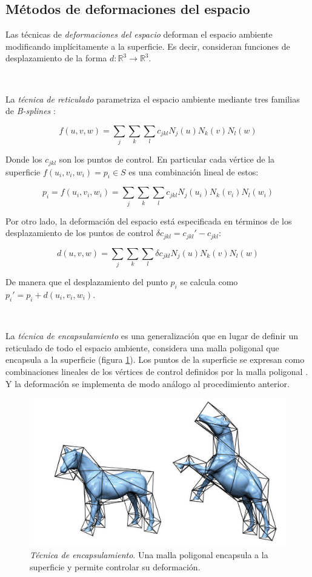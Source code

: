 \documentclass{article}
\begin{document}
\subsection{Métodos de deformaciones del espacio}
Las técnicas de \emph{deformaciones del espacio} deforman el espacio ambiente 
modificando implícitamente a la superficie. Es decir, consideran funciones 
de desplazamiento de la forma $d: \mathbb{R}^3 \rightarrow \mathbb{R}^3$.

\

La \emph{técnica de reticulado} parametriza el espacio ambiente 
mediante tres familias de \emph{B-splines} \cite{G:2015}:

$$f(u,v,w) = \sum_j \sum_k \sum_l c_{jkl} N_j(u) N_k(v) N_l(w)$$

Donde los $c_{jkl}$ son los puntos de control. En particular cada vértice de 
la superficie $f(u_i, v_i, w_i) = p_i \in S$ es una combinación lineal 
de estos:

$$p_i = f(u_i, v_i, w_i) = \sum_j \sum_k \sum_l c_{jkl} N_j(u_i) N_k(v_i) N_l(w_i)$$

Por otro lado, la deformación del espacio está especificada en términos 
de los desplazamiento de los puntos de control $\delta c_{jkl} = c_{jkl}' - c_{jkl}$:

$$d(u,v,w) = \sum_j \sum_k \sum_l \delta c_{jkl} N_j(u) N_k(v) N_l(w)$$

De manera que el desplazamiento del punto $p_i$ se calcula como $p_i' = 
p_i + d(u_i,v_i,w_i)$.

\

La \emph{técnica de encapsulamiento} es una generalización que en lugar 
de definir un reticulado de todo el espacio ambiente, considera una malla 
poligonal que encapsula a la superficie (figura \ref{fig:caballo}). Los 
puntos de la superficie se expresan como combinaciones lineales de los 
vértices de control definidos por la malla poligonal \cite{L:2008}. Y la 
deformación se implementa de modo análogo al procedimiento anterior.

\begin{figure}
	\includegraphics[scale=.5]{caballo.png} %
	\caption{\emph{Técnica de encapsulamiento}. Una malla poligonal 
	encapsula a la superficie y permite controlar su deformación.}%
	\label{fig:caballo} %
\end{figure}
\end{document}
